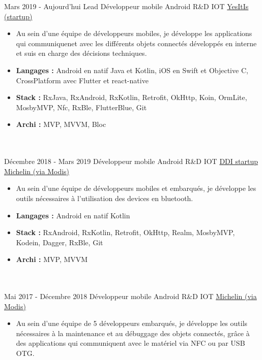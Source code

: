 \documentclass[letterpaper]{twentysecondcv} %
\begin{document}
\begin{twenty} %
\twentyitem
    	{Mars 2019 -}
		{Aujourd'hui}
        {Lead Développeur mobile Android R\&D IOT}
        {\href{https://yesitis.fr/}{YesItIs (startup)}}
        {}
        {\begin{itemize}
        \item Au sein d'une équipe de développeurs mobiles, je développe les applications qui communiquenet avec les différents objets connectés développés en interne et suis en charge des décisions techniques.
         \item  \textbf{Langages : }Android en natif Java et Kotlin, iOS en Swift et Objective C, CrossPlatform avec Flutter et react-native
        \item \textbf{Stack : }RxJava, RxAndroid, RxKotlin, Retrofit, OkHttp, Koin, OrmLite, MosbyMVP, Nfc, RxBle, FlutterBlue, Git
        \item \textbf{Archi : }MVP, MVVM, Bloc
        \end{itemize}}
        \\ \\
\twentyitem
    	{Décembre 2018 -}
		{Mars 2019}
        {Développeur mobile Android R\&D IOT}
        {\href{https://ddi.michelin.com/}{DDI startup Michelin (via Modis)}}
        {}
        {\begin{itemize}
        \item Au sein d'une équipe de développeurs mobiles et embarqués, je développe les outils nécessaires à l'utilisation des devices en bluetooth.
         \item  \textbf{Langages : }Android en natif Kotlin
        \item \textbf{Stack :} RxAndroid, RxKotlin, Retrofit, OkHttp, Realm, MosbyMVP, Kodein, Dagger, RxBle, Git 
        \item \textbf{Archi :} MVP, MVVM
        \end{itemize}}
        \\ \\
\twentyitem
    	{Mai 2017 -}
		{Décembre 2018}
        {Développeur mobile Android R\&D IOT}
        {\href{http://www.michelin.fr/}{Michelin (via Modis)}}
        {}
        {\begin{itemize}
        \item Au sein d'une équipe de 5 développeurs embarqués, je développe les outils nécessaires à la maintenance et au débuggage des objets connectés, grâce à des applications qui communiquent avec le matériel via NFC ou par USB OTG.

\end{itemize}}
\end{twenty}
\end{document}
